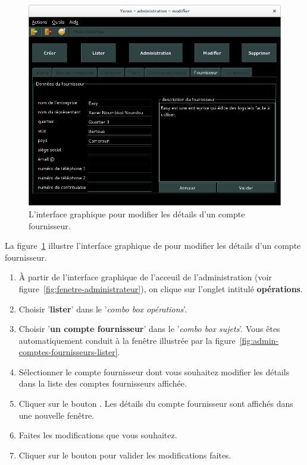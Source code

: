 \begin{figure}[!htpb]
	\centering
	\includegraphics[scale=0.45]{images/compte-fournisseur-modifier.png}
	\caption{L'interface graphique pour modifier les
			d\'etails d'un compte fournisseur.}
	\label{fig:admin-comptes-fournisseurs-modifier}
\end{figure}

La figure~\ref{fig:admin-comptes-fournisseurs-modifier} illustre
l'interface graphique de \yeroth pour modifier les
d\'etails d'un compte fournisseur.

\begin{enumerate}[1)]
	\item \`A partir de l'interface graphique de l'acceuil de
		l'administration (voir figure~\ref{fig:fenetre-administrateur}),
		on clique sur l'onglet intitul\'e \textbf{op\'erations}. 
		
	\item Choisir '\textbf{lister}' dans le '\emph{combo box
		op\'erations}'.
		
	\item Choisir '\textbf{un compte fournisseur}' dans le '\emph{combo box
		sujets}'. Vous \^etes automatiquement conduit \`a la fen\^etre
		illustr\'ee par la figure~\ref{fig:admin-comptes-fournisseurs-lister}.
		
	\item S\'electionner le compte fournisseur dont vous souhaitez
		modifier les d\'etails dans la liste des comptes fournisseurs
		affich\'ee.
		
	\item Cliquer sur le bouton . Les d\'etails
		du compte fournisseur sont affich\'es dans une nouvelle fen\^etre.
		
	\item Faites les modifications que vous souhaitez.
		
	\item Cliquer sur le bouton  pour valider
		les modifications faites.
\end{enumerate}

